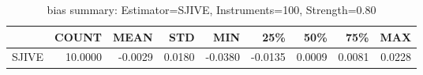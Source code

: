 \begin{table}[ht]
\centering
\caption{bias summary: Estimator=SJIVE, Instruments=100, Strength=0.80}
\begin{tabular}{lrrrrrrrr}
\toprule
 & COUNT & MEAN & STD & MIN & 25\% & 50\% & 75\% & MAX \\
\midrule
SJIVE & 10.0000 & -0.0029 & 0.0180 & -0.0380 & -0.0135 & 0.0009 & 0.0081 & 0.0228 \\
\bottomrule
\end{tabular}
\end{table}
